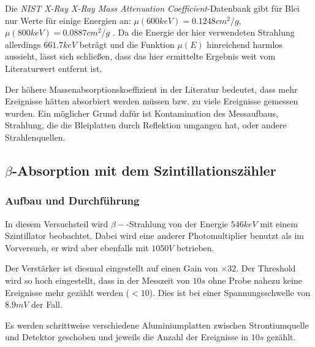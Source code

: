\documentclass{../Misc/MontavonLaTeX/Montavon}
\begin{document}
Die \emph{NIST X-Ray X-Ray Mass Attenuation Coefficient}-Datenbank gibt für Blei nur Werte für einige Energien an: $\mu(600 \unit{keV}) = 0.1248 \unit{cm^2 / g}$, $\mu(800 \unit{keV}) = 0.0887 \unit{cm^2 / g}$ \cite{nist_lead}. Da die Energie der hier verwendeten Strahlung allerdings $661.7 \unit{keV}$ beträgt und die Funktion $\mu(E)$ hinreichend harmlos aussieht, lässt sich schließen, dass das hier ermittelte Ergebnis weit vom Literaturwert entfernt ist. 

Der höhere Massenabsorptionskoeffizient in der Literatur bedeutet, dass mehr Ereignisse hätten absorbiert werden müssen bzw. zu viele Ereignisse gemessen wurden. Ein möglicher Grund dafür ist Kontamination des Messaufbaus, Strahlung, die die Bleiplatten durch Reflektion umgangen hat, oder andere Strahlenquellen. 

\subsection{$\beta$-Absorption mit dem Szintillationszähler}
\subsubsection{Aufbau und Durchführung}
In diesem Versuchsteil wird $\beta-$-Strahlung von  der Energie $546 \unit{keV}$ \cite{wiki_strontium} mit einem Szintillator beobachtet. Dabei wird eine anderer Photomultiplier benutzt als im Vorversuch, er wird aber ebenfalls mit $1050 \unit{V}$ betrieben.

Der Verstärker ist diesmal eingestellt auf einen Gain von $\times 32$. Der Threshold wird so hoch eingestellt, dass in der Messzeit von $10 \unit{s}$ ohne Probe nahezu keine Ereignisse mehr gezählt werden ($< 10$). Dies ist bei einer Spannungsschwelle von $8.9 \unit{mV}$ der Fall.

Es werden schrittweise verschiedene Aluminiumplatten zwischen Strontiumquelle und Detektor geschoben und jeweils die Anzahl der Ereignisse in $10 \unit{s}$ gezählt.
\end{document}
